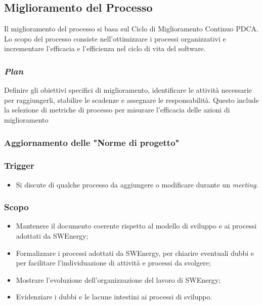 \subsection{Miglioramento del Processo}

Il miglioramento del processo si basa sul Ciclo di Miglioramento Continuo PDCA.\\
Lo scopo del processo consiste nell'ottimizzare i processi organizzativi e
incrementare l'efficacia e l'efficienza nel ciclo di vita del software.

\subsubsection{\textit{Plan}}
	  Definire gli obiettivi specifici di miglioramento, identificare le
	  attività necessarie per raggiungerli, stabilire le scadenze e
	  assegnare le responsabilità. Questo include la selezione di metriche
	  di processo per misurare l'efficacia delle azioni di miglioramento






\subsubsection{Aggiornamento delle "Norme di progetto"}
\label{aggiornare-ndp}

\subsubsection*{Trigger}
\begin{itemize}
	\item Si discute di qualche processo da aggiungere o modificare durante un
		\textit{meeting}.
\end{itemize}

\subsubsection*{Scopo}
\begin{itemize}
	\item Mantenere il documento coerente rispetto al modello di sviluppo e ai
		processi adottati da SWEnergy;

	\item Formalizzare i processi adottati da SWEnergy, per chiarire eventuali
		dubbi e per facilitare l'individuazione di attività e processi da
		svolgere;

	\item Mostrare l'evoluzione dell'organizzazione del lavoro di SWEnergy;

	\item Evidenziare i dubbi e le lacune intestini ai processi di sviluppo.
\end{itemize}

